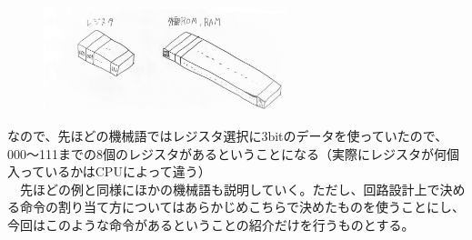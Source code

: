 \begin{figure}[H]
  \centering
  \includegraphics[height=3cm]{honda/image/10.jpg}
\end{figure}
なので、先ほどの機械語ではレジスタ選択に3bitのデータを使っていたので、000～111までの8個のレジスタがあるということになる（実際にレジスタが何個入っているかはCPUによって違う）\\
　先ほどの例と同様にほかの機械語も説明していく。ただし、回路設計上で決める命令の割り当て方についてはあらかじめこちらで決めたものを使うことにし、今回はこのような命令があるということの紹介だけを行うものとする。
